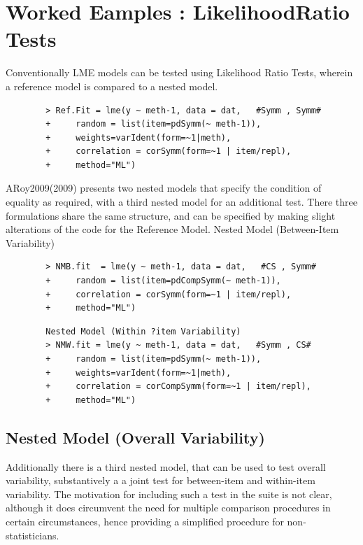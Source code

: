 \documentclass[12pt, a4paper]{report}
\theoremstyle{plain}
\theoremstyle{definition}
\theoremstyle{remark}
\begin{document}
	
	
	
	
	
	\section{Worked Eamples : LikelihoodRatio Tests}
	
	Conventionally LME models can be tested using Likelihood Ratio Tests, wherein a reference model is compared to a nested model.
	\begin{framed}
		\begin{verbatim}
		> Ref.Fit = lme(y ~ meth-1, data = dat,   #Symm , Symm#
		+     random = list(item=pdSymm(~ meth-1)), 
		+     weights=varIdent(form=~1|meth),
		+     correlation = corSymm(form=~1 | item/repl), 
		+     method="ML")
		\end{verbatim}
	\end{framed}
	ARoy2009(2009) presents two nested models that specify the condition of equality as required, with a third nested model for an additional test. There three formulations share the same structure, and can be specified by making slight alterations of the code for the Reference Model.
	Nested Model (Between-Item Variability)
	\begin{framed}
		\begin{verbatim}
		> NMB.fit  = lme(y ~ meth-1, data = dat,   #CS , Symm#
		+     random = list(item=pdCompSymm(~ meth-1)),
		+     correlation = corSymm(form=~1 | item/repl), 
		+     method="ML")
		\end{verbatim}
	\end{framed}
	
	
	
	\begin{framed}
		\begin{verbatim}
		Nested Model (Within ?item Variability)
		> NMW.fit = lme(y ~ meth-1, data = dat,   #Symm , CS# 
		+     random = list(item=pdSymm(~ meth-1)),
		+     weights=varIdent(form=~1|meth), 
		+     correlation = corCompSymm(form=~1 | item/repl), 
		+     method="ML")
		\end{verbatim}
	\end{framed}
	
	\subsection{Nested Model (Overall Variability)}
	Additionally there is a third nested model, that can be used to test overall variability, substantively a a joint test for between-item and within-item variability. The motivation for including such a test in the suite is not clear, although it does circumvent the need for multiple comparison procedures in certain circumstances, hence providing a simplified procedure for non-statisticians.
	
\end{document}
